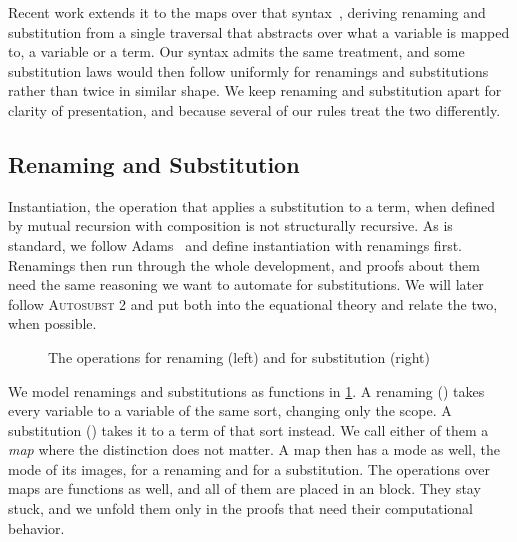 \documentclass[sigplan,anonymous,review]{acmart}
\theoremstyle{acmdefinition}
\begin{document}
Recent work extends it to the maps over that
syntax~\cite{altenkirch2025substitution, ren-sub}, deriving renaming and
substitution from a single traversal that abstracts over what a variable is
mapped to, a variable or a term. Our syntax admits the same treatment, and some
substitution laws would then follow uniformly for renamings and substitutions
rather than twice in similar shape. We keep renaming and substitution apart for
clarity of presentation, and because several of our rules treat the two
differently.

\subsection{Renaming and Substitution}\label{sec:mis-sub}

Instantiation, the operation that applies a substitution to a term, when
defined by mutual recursion with composition is not structurally recursive. As
is standard, we follow Adams~\cite{10.1007/11617990_1} and define instantiation
with renamings first. Renamings then run through the whole development, and
proofs about them need the same reasoning we want to automate for
substitutions. We will later follow \textsc{Autosubst 2} and put both into the
equational theory and relate the two, when possible.

\begin{figure}[t]
  \AgdaNoSpaceAroundCode{}
  \setlength{\mathindent}{0pt}
  \setlength{\AgdaEmptySkip}{0.55\baselineskip}
  \begin{minipage}[t]{0.46\linewidth}
    \raggedright{}
    \ERen{}
    \vspace{0.2\baselineskip}
    \ERenOps{}
  \end{minipage}
  \hfill
  \begin{minipage}[t]{0.50\linewidth}
    \raggedright{}
    \ESub{}
    \vspace{0.2\baselineskip}
    \ESubT{}
    \vspace{0.55\baselineskip}
    \begin{minipage}[t]{\linewidth}\raggedright{}\ESubIdWk{}\end{minipage}
  \end{minipage}
  \caption{The operations for renaming (left) and for substitution (right)}\label{fig:mis-ras}
\end{figure}

We model renamings and substitutions as functions in \cref{fig:mis-ras}. A
renaming () takes every variable to a variable of the same
sort, changing only the scope. A substitution () takes it
to a term of that sort instead. We call either of them a \emph{map} where the
distinction does not matter. A map then has a mode as well, the mode of its
images,  for a renaming and
 for a substitution. The operations over maps are
functions as well, and all of them are placed in an  block.
They stay stuck, and we unfold them only in the proofs that need their
computational behavior.
\end{document}
